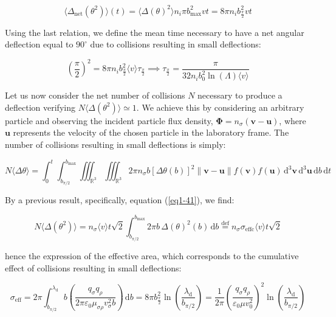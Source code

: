 \begin{equation}
    \langle\Delta_\text{net}(\theta^2)\rangle(t)= \langle\Delta(\theta)^2\rangle n_i\pi b_\text{max}^2vt=8\pi n_ib_\frac{\pi}{2}^2 vt
\end{equation}

Using the last relation, we define the mean time necessary to have a net angular deflection equal to $90^\circ$ due to collisions resulting in small deflections:

\begin{equation}
    \left(\frac{\pi}{2}\right)^2=8\pi n_ib_\frac{\pi}{2}^2 \langle v\rangle\tau_\frac{\pi}{2}\implies\tau_\frac{\pi}{2}=\frac{\pi}{32n_ib_0^2\ln(\Lambda)\langle v\rangle}
\end{equation}

Let us now consider the net number of collisions $N$ necessary to produce a deflection verifying $N\langle\Delta(\theta^2)\rangle\simeq1$. We achieve this by considering an arbitrary particle and observing the incident particle flux density, $\mathbf{\Phi}=n_\sigma(\mathbf{v}-\mathbf{u})$, where $\mathbf{u}$ represents the velocity of the chosen particle in the laboratory frame. The number of collisions resulting in small deflections is simply:

\begin{equation}
    N\langle\Delta\theta\rangle=\int_0^t\int_{b_{\pi/2}}^{b_\text{max}}\iiint_{\mathbb{R}^3}\iiint_{\mathbb{R}^3}2\pi n_\sigma b\left[\Delta\theta(b)\right]^2\|\mathbf{v}-\mathbf{u}\|f(\mathbf{v})f(\mathbf{u})\,\mathrm{d}^3\mathbf{v}\,\mathrm{d}^3\mathbf{u}\,\mathrm{d}b\,\mathrm{d}t
\end{equation}

By a previous result, specifically, equation (\ref{eq1-41}), we find:

\begin{equation}
    N\langle\Delta(\theta^2)\rangle=n_\sigma\langle v\rangle t\sqrt{2}\int_{b_{\pi/2}}^{b_\text{max}}2\pi b\,\Delta(\theta)^2(b)\,\mathrm{d}b\stackrel{\text{def}}{=}n_\sigma\sigma_\text{effc}\langle v\rangle t\sqrt{2}
\end{equation}

hence the expression of the effective area, which corresponds to the cumulative effect of collisions resulting in small deflections:

\begin{equation}
    \sigma_\text{eff}=2\pi\int_{b_{\pi/2}}^{\lambda_\mathrm{d}}b\left(\frac{q_\sigma q_\rho}{2\pi\varepsilon_0\mu_{\sigma\rho}v_\sigma^2b}\right)\,\mathrm{d}b=8\pi b_\frac{\pi}{2}^2\ln\left(\frac{\lambda_\mathrm{d}}{b_{\pi/2}}\right)=\frac{1}{2\pi}\left(\frac{q_\sigma q_\rho}{\varepsilon_0\mu v_0^2}\right)^2\ln\left(\frac{\lambda_\mathrm{d}}{b_{\pi/2}}\right)
\end{equation}

